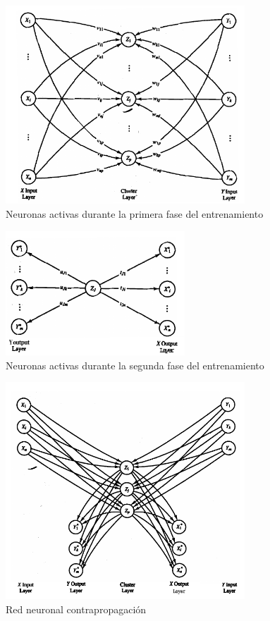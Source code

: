 \begin{figure}[hbtp]
\centering
\includegraphics[width=0.8\textwidth]{img/phase1.png}
\caption{Neuronas activas durante la primera fase del entrenamiento}
\label{figure:counterpropagationPhase1}
\end{figure}

\begin{figure}[hbtp]
\centering
\includegraphics[width=0.6\textwidth]{img/phase2.png}
\caption{Neuronas activas durante la segunda fase del entrenamiento}
\label{figure:counterpropagationPhase2}
\end{figure}

\begin{figure}[hbtp]
\centering
\includegraphics[width=0.8\textwidth]{img/total.png}
\caption{Red neuronal contrapropagación}
\label{figure:counterpropagationTotal}
\end{figure}

